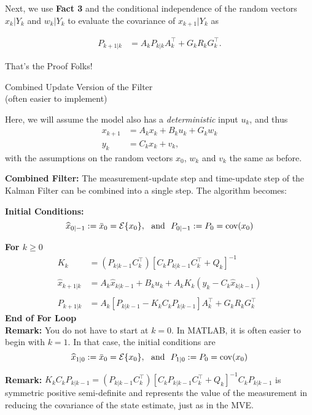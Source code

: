 \documentclass[letterpaper]{article}
\newcommand{\cov}{\mathrm{cov}}
\newcommand{\Expectof}[1]{{\cal E} \{ #1 \}}
\begin{document}
Next, we use \textbf{Fact 3} and the conditional independence of the random vectors $x_k| Y_k$ and $w_k | Y_k$ to evaluate
the covariance of $x_{k+1}|Y_k$ as

\begin{align*}
P_{k+1|k} &= A_k P_{k|k} A_k^\top  + G_k R_k G_k^\top.
\end{align*}


\vspace*{1cm}

 {\Large \bf
\begin{center}
 That's the Proof Folks!
\end{center}
}

 \newpage
 {\Large \bf
\begin{center}
 Combined Update Version of the Filter\\
 (often easier to implement)
\end{center}
}

Here, we will assume the model also has a \textit{deterministic} input $u_k$, and thus
\begin{align*}
x_{k+1} &= A_k x_k + B_k u_k + G_k w_k \\
y_k &= C_k x_k + v_k,
\end{align*}
with the assumptions on the random vectors $x_0$, $w_k$ and $v_k$ the same as before.

\textbf{Combined Filter:} The measurement-update step and time-update step of the  Kalman Filter can be combined into a single step. The algorithm becomes:

\textbf{Initial Conditions:}
$$\widehat{x}_{0|-1} :=\bar{x}_0 = \Expectof{x_0},~~\mbox{and}~~P_{0|-1}:=P_0=\cov(x_0)  $$

\textbf{For $k \ge 0$}
\begin{align*}
K_k & = (P_{k|k-1} C_k^\top) \left[ C_k P_{k|k-1} C_k^\top + Q_k \right]^{-1}\\
& \\
\widehat{x}_{k+1|k}&= A_k \widehat{x}_{k|k-1} + B_k u_k + A_k K_k \left( y_k - C_k   \widehat{x}_{k|k-1} \right) \\
& \\
P_{k+1|k} &= A_k \left[ P_{k|k-1} - K_k C_k P_{k|k-1} \right] A_k ^\top + G_k R_k G_k^\top
\end{align*}
\textbf{End of For Loop}\\


\textbf{Remark:} You do not have to start at $k=0$. In MATLAB, it is often easier to begin with $k=1$. In that case, the initial conditions are
$$\widehat{x}_{1|0} :=\bar{x}_0 = \Expectof{x_0},~~\mbox{and}~~P_{1|0}:=P_0=\cov(x_0)  $$

\textbf{Remark:} $ K_k C_k P_{k|k-1} =  (P_{k|k-1} C_k^\top) \left[ C_k P_{k|k-1} C_k^\top + Q_k \right]^{-1}C_k P_{k|k-1}$ is symmetric positive semi-definite and represents the value of the measurement in reducing the covariance of the state estimate, just as in the MVE.
\end{document}
